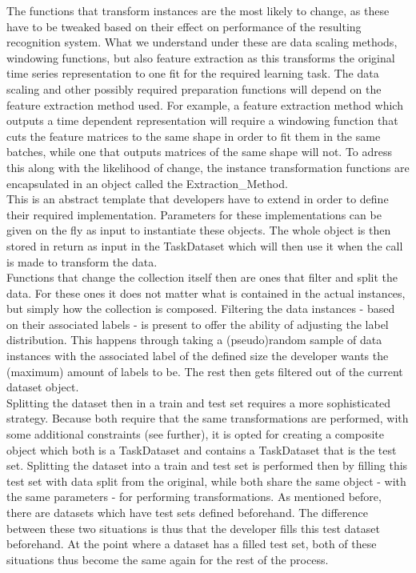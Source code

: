 The functions that transform instances are the most likely to change, as these have to be tweaked based on their effect on performance of the resulting recognition system. What we understand under these are data scaling methods, windowing functions, but also feature extraction as this transforms the original time series representation to one fit for the required learning task. The data scaling and other possibly required preparation functions will depend on the feature extraction method used. For example, a feature extraction method which outputs a time dependent representation will require a windowing function that cuts the feature matrices to the same shape in order to fit them in the same batches, while one that outputs matrices of the same shape will not. To adress this along with the likelihood of change, the instance transformation functions are encapsulated in an object called the Extraction\_Method. \\

This is an abstract template that developers have to extend in order to define their required implementation. Parameters for these implementations can be given on the fly as input to instantiate these objects. The whole object is then stored in return as input in the TaskDataset which will then use it when the call is made to transform the data. \\

Functions that change the collection itself then are ones that filter and split the data. For these ones it does not matter what is contained in the actual instances, but simply how the collection is composed. Filtering the data instances - based on their associated labels - is present to offer the ability of adjusting the label distribution. This happens through taking a (pseudo)random sample of data instances with the associated label of the defined size the developer wants the (maximum) amount of labels to be. The rest then gets filtered out of the current dataset object. \\

Splitting the dataset then in a train and test set requires a more sophisticated strategy. Because both require that the same transformations are performed, with some additional constraints (see further), it is opted for creating a composite object which both is a TaskDataset and contains a TaskDataset that is the test set. Splitting the dataset into a train and test set is performed then by filling this test set with data split from the original, while both share the same object - with the same parameters - for performing transformations. As mentioned before, there are datasets which have test sets defined beforehand. The difference between these two situations is thus that the developer fills this test dataset beforehand. At the point where a dataset has a filled test set, both of these situations thus become the same again for the rest of the process. \\

